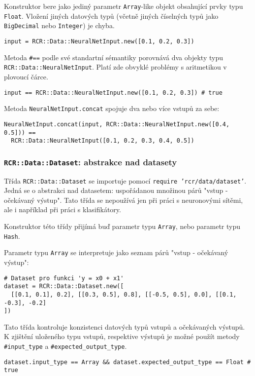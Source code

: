 \documentclass[a4paper]{article}
\begin{document}
Konstruktor bere jako jediný parametr \texttt{Array}-like objekt obsahující
prvky typu \texttt{Float}. Vložení jiných datových typů (včetně jiných číselných
typů jako \texttt{BigDecimal} nebo \texttt{Integer}) je chyba.
\begin{lstlisting}
input = RCR::Data::NeuralNetInput.new([0.1, 0.2, 0.3])
\end{lstlisting}

Metoda \texttt{\#==} podle své standartní sémantiky porovnává dva objekty typu
\texttt{RCR::Data::NeuralNetInput}. Platí zde obvyklé problémy s aritmetikou
v plovoucí čárce.
\begin{lstlisting}
input == RCR::Data::NeuralNetInput.new([0.1, 0.2, 0.3]) # true
\end{lstlisting}

Metoda \texttt{NeuralNetInput.concat} spojuje dva nebo více vstupů za sebe:
\begin{lstlisting}
NeuralNetInput.concat(input, RCR::Data::NeuralNetInput.new([0.4, 0.5])) ==
  RCR::Data::NeuralNetInput([0.1, 0.2, 0.3, 0.4, 0.5])
\end{lstlisting}


\subsubsection{\texttt{RCR::Data::Dataset}: abstrakce nad datasety}
Třída \texttt{RCR::Data::Dataset} se importuje pomocí \texttt{require
'rcr/data/dataset'}. Jedná se o abstrakci nad datasetem: uspořádanou
množinou párů "vstup - očekávaný výstup". Tato třída se nepoužívá jen
při práci s neuronovými sítěmi, ale i například při práci s klasifikátory.

Konstruktor této třídy přijímá buď parametr typu \texttt{Array}, nebo parametr
typu \texttt{Hash}.

Parametr typu \texttt{Array} se interpretuje jako seznam
párů "vstup - očekávaný výstup":
\begin{lstlisting}
# Dataset pro funkci 'y = x0 + x1'
dataset = RCR::Data::Dataset.new([
  [[0.1, 0.1], 0.2], [[0.3, 0.5], 0.8], [[-0.5, 0.5], 0.0], [[0.1, -0.3], -0.2]
])
\end{lstlisting}

Tato třída kontroluje konzistenci datových typů vstupů a očekávaných výstupů.
K zjištění uloženého typu vstupů, respektive výstupů je možné použít metody
\texttt{\#input\_type} a \texttt{\#expected\_output\_type}.
\begin{lstlisting}
dataset.input_type == Array && dataset.expected_output_type == Float # true
\end{lstlisting}
\end{document}
